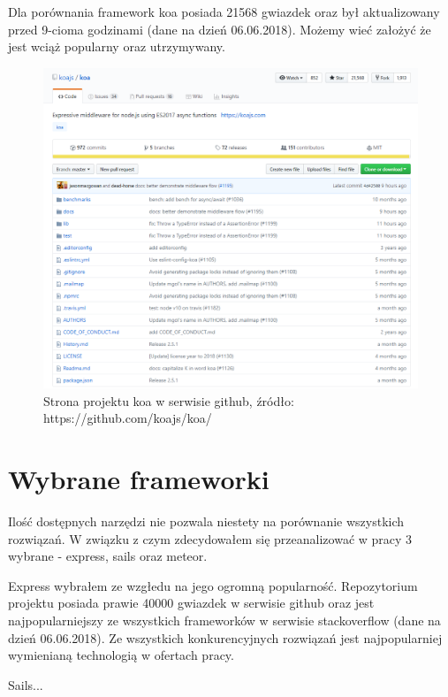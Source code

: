 \documentclass[12pt]{report}
\begin{document}
  Dla porównania framework koa posiada 21568 gwiazdek oraz był aktualizowany przed 9-cioma godzinami (dane na dzień 06.06.2018). Możemy wieć założyć że jest wciąż popularny oraz utrzymywany.

  \begin{figure}[!hb]
    \centering
    \includegraphics[width=\textwidth,height=\textheight,keepaspectratio]{koa.png} 
    \caption{Strona projektu koa w serwisie github, źródło: https://github.com/koajs/koa/}
  \end{figure}

  \section{Wybrane frameworki}

  Ilość dostępnych narzędzi nie pozwala niestety na porównanie wszystkich rozwiązań.
  W związku z czym zdecydowałem się przeanalizować w pracy 3 wybrane - express, sails oraz meteor.

  \newline
  Express wybrałem ze wzgłedu na jego ogromną popularność. 
  Repozytorium projektu posiada prawie 40000 gwiazdek w serwisie github oraz jest najpopularniejszy ze wszystkich frameworków w serwisie stackoverflow (dane na dzień 06.06.2018).
  Ze wszystkich konkurencyjnych rozwiązań jest najpopularniej wymienianą technologią w ofertach pracy.

  \newline
  Sails...
\end{document}

